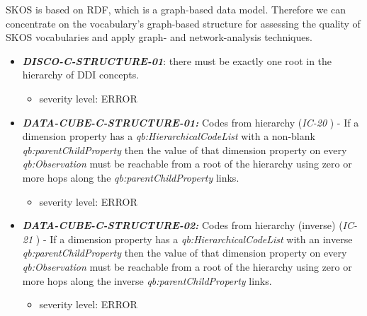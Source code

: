 \documentclass{llncs}
\begin{document}
SKOS is based on RDF, which is a graph-based data model. Therefore we can concentrate on the vocabulary's graph-based structure for assessing the quality of SKOS vocabularies and apply graph- and network-analysis techniques. 

\begin{itemize}
	\item \textbf{{\em DISCO-C-STRUCTURE-01}}: there must be exactly one root in the hierarchy of DDI concepts. 
	\begin{itemize}
		\item severity level: ERROR
	\end{itemize}
\end{itemize} 

\begin{itemize}
	\item \textbf{{\em DATA-CUBE-C-STRUCTURE-01:}}
	Codes from hierarchy (\emph{IC-20} \cite{CyganiakReynolds2014}) -  
	If a dimension property has a \emph{qb:HierarchicalCodeList} with a non-blank \emph{qb:parentChildProperty} then the value of that dimension property on every \emph{qb:Observation} must be reachable from a root of the hierarchy using zero or more hops along the \emph{qb:parentChildProperty} links. 
	\begin{itemize}
		\item severity level: ERROR
	\end{itemize}
	\item \textbf{{\em DATA-CUBE-C-STRUCTURE-02:}}
	Codes from hierarchy (inverse) (\emph{IC-21} \cite{CyganiakReynolds2014}) -  
	If a dimension property has a \emph{qb:HierarchicalCodeList} with an inverse \emph{qb:parentChildProperty} then the value of that dimension property on every \emph{qb:Observation} must be reachable from a root of the hierarchy using zero or more hops along the inverse \emph{qb:parentChildProperty} links. 
	\begin{itemize}
		\item severity level: ERROR
	\end{itemize}
\end{itemize}
\end{document}
